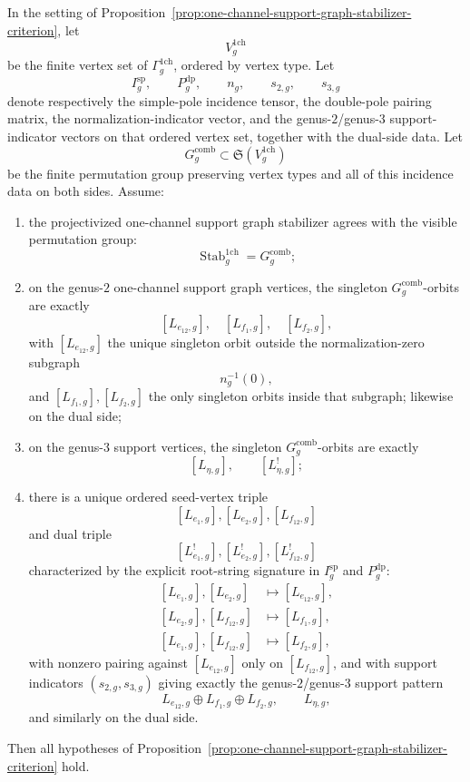 \begin{proposition}\label{prop:one-channel-incidence-orbit-criterion}
In the setting of
Proposition~\textup{\ref{prop:one-channel-support-graph-stabilizer-criterion}},
let
\[
V_g^{\mathrm{1ch}}
\]
be the finite vertex set of
$\Gamma_g^{\mathrm{1ch}}$, ordered by vertex type.  Let
\[
I_g^{\mathrm{sp}},
\qquad
P_g^{\mathrm{dp}},
\qquad
n_g,
\qquad
s_{2,g},
\qquad
s_{3,g}
\]
denote respectively the simple-pole incidence tensor, the
double-pole pairing matrix, the normalization-indicator vector, and the
genus-$2$/genus-$3$ support-indicator vectors on that ordered vertex
set, together with the dual-side data.  Let
\[
G_g^{\mathrm{comb}}
\subset
\mathfrak{S}(V_g^{\mathrm{1ch}})
\]
be the finite permutation group preserving vertex types and all of this
incidence data on both sides.  Assume:
\begin{enumerate}[label=\textup{(\roman*)}]
\item the projectivized one-channel support graph stabilizer agrees with the
  visible permutation group:
  \[
  \operatorname{Stab}_g^{\mathrm{1ch}} = G_g^{\mathrm{comb}};
  \]
\item on the genus-$2$ one-channel support graph vertices, the singleton
  $G_g^{\mathrm{comb}}$-orbits are exactly
  \[
  [L_{e_{12},g}],\quad [L_{f_1,g}],\quad [L_{f_2,g}],
  \]
  with $[L_{e_{12},g}]$ the unique singleton orbit outside
  the normalization-zero subgraph
  \[
  n_g^{-1}(0),
  \]
  and $[L_{f_1,g}], [L_{f_2,g}]$ the only singleton orbits inside that
  subgraph;
  likewise on the dual side;
\item on the genus-$3$ support vertices, the singleton
  $G_g^{\mathrm{comb}}$-orbits are exactly
  \[
  [L_{\eta,g}],\qquad [L_{\eta,g}^!];
  \]
\item there is a unique ordered seed-vertex triple
  \[
  [L_{e_1,g}], [L_{e_2,g}], [L_{f_{12},g}]
  \]
  and dual triple
  \[
  [L_{e_1,g}^!], [L_{e_2,g}^!], [L_{f_{12},g}^!]
  \]
  characterized by the explicit root-string signature in
  $I_g^{\mathrm{sp}}$ and $P_g^{\mathrm{dp}}$:
  \[
  \begin{alignedat}{1}
  [L_{e_1,g}], [L_{e_2,g}]&\mapsto [L_{e_{12},g}],\\
  [L_{e_2,g}], [L_{f_{12},g}]&\mapsto [L_{f_1,g}],\\
  [L_{e_1,g}], [L_{f_{12},g}]&\mapsto [L_{f_2,g}],
  \end{alignedat}
  \]
  with nonzero pairing against $[L_{e_{12},g}]$ only on
  $[L_{f_{12},g}]$, and with support indicators
  $(s_{2,g},s_{3,g})$ giving exactly the genus-$2$/genus-$3$ support
  pattern
  \[
  L_{e_{12},g}\oplus L_{f_1,g}\oplus L_{f_2,g},
  \qquad
  L_{\eta,g},
  \]
  and similarly on the dual side.
\end{enumerate}
Then all hypotheses of
Proposition~\ref{prop:one-channel-support-graph-stabilizer-criterion}
hold.


\end{proposition}
